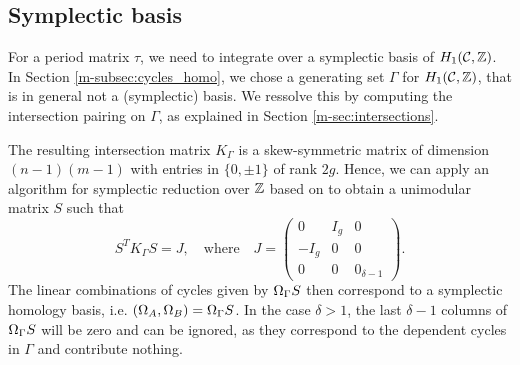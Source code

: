 \documentclass[main.tex]{subfiles}
\begin{document}
  \subsection{Symplectic basis}\label{subsec:symp_basis}

  For a period matrix $\tau$, we need to integrate over a symplectic basis of $H_1(\mathcal{C},\mathbb{Z})$. In Section \ref{m-subsec:cycles_homo}, we chose a generating set $\Gamma$ for $H_1(\mathcal{C},\mathbb{Z})$, that is in general not
  a (symplectic) basis. We ressolve this by computing the intersection pairing on $\Gamma$, as explained in Section \ref{m-sec:intersections}. 
  
  The resulting intersection matrix $K_{\Gamma}$
   is a skew-symmetric matrix of dimension \\ $(n-1)(m-1)$ with entries in $\{ 0,\pm 1\}$ of rank $2g$. Hence, we can apply an algorithm
  for symplectic reduction over $\mathbb{Z}$ based on
    \cite[Theorem 18]{KB2002} to obtain a unimodular matrix $S$ such that
  $$S^T K_{\Gamma}  S = J, \quad \text{where} \quad J = \begin{pmatrix} 0 & I_g & 0 \\ -I_g & 0 & 0 \\ 0 & 0 & 0_{\delta-1} \end{pmatrix}.$$
  The linear combinations of cycles given by $\Omega_{\Gamma} S$ then correspond to a symplectic homology basis, i.e. $(\Omega_A,\Omega_B) = \Omega_{\Gamma} S$.
  In the case $\delta > 1$,
  the last $\delta-1$ columns of $\Omega_{\Gamma} S$ will be zero and can be ignored, as they correspond to the dependent cycles
  in $\Gamma$ and contribute nothing.


\biblio
\end{document}
